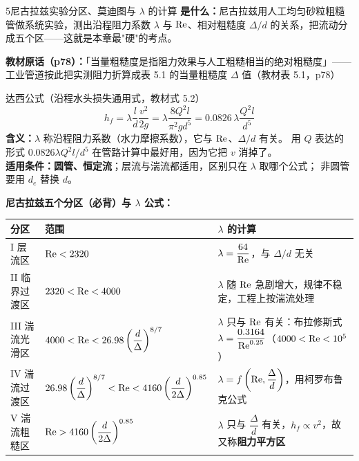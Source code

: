 \begin{kaodian}{5}{尼古拉兹实验分区、莫迪图与 $\lambda$ 的计算}
\textbf{是什么：}尼古拉兹用人工均匀砂粒粗糙管做系统实验，测出沿程阻力系数 $\lambda$ 与
$\mathrm{Re}$、相对粗糙度 $\Delta/d$ 的关系，把流动分成五个区——这就是本章最"硬"的考点。

\noindent\textbf{教材原话（p78）：}「当量粗糙度是指阻力效果与人工粗糙相当的绝对粗糙度」——
工业管道按此把实测阻力折算成表 5.1 的当量粗糙度 $\Delta$ 值（教材表 5.1，p78）

\begin{gongshi}{达西公式（沿程水头损失通用式，教材式 5.2）}
\[ h_f=\lambda\frac{l}{d}\frac{v^2}{2g}=\lambda\frac{8Q^2l}{\pi^2gd^5}=0.0826\,\lambda\frac{Q^2l}{d^5} \]
\textbf{含义：}$\lambda$ 称沿程阻力系数（水力摩擦系数），它与 $\mathrm{Re}$、$\Delta/d$ 有关。
用 $Q$ 表达的形式 $0.0826\lambda Q^2l/d^5$ 在管路计算中最好用，因为它把 $v$ 消掉了。\\
\textbf{适用条件：}\textbf{圆管、恒定流}；层流与湍流都适用，区别只在 $\lambda$ 取哪个公式；
非圆管要用 $d_e$ 替换 $d$。
\end{gongshi}

\textbf{尼古拉兹五个分区（必背）与 $\lambda$ 公式：}
\begin{center}
\begin{tabularx}{\textwidth}{@{}lXX@{}}
\toprule
分区 & 范围 & $\lambda$ 的计算 \\
\midrule
I 层流区 & $\mathrm{Re}<2320$ & $\lambda=\dfrac{64}{\mathrm{Re}}$，与 $\Delta/d$ 无关 \\
II 临界过渡区 & $2320<\mathrm{Re}<4000$ & $\lambda$ 随 $\mathrm{Re}$ 急剧增大，规律不稳定，工程上按湍流处理 \\
III 湍流光滑区 & $4000<\mathrm{Re}<26.98\left(\dfrac{d}{\Delta}\right)^{8/7}$ & $\lambda$ 只与 $\mathrm{Re}$ 有关：布拉修斯式 $\lambda=\dfrac{0.3164}{\mathrm{Re}^{0.25}}$（$4000<\mathrm{Re}<10^5$） \\
IV 湍流过渡区 & $26.98\left(\dfrac{d}{\Delta}\right)^{8/7}<\mathrm{Re}<4160\left(\dfrac{d}{2\Delta}\right)^{0.85}$ & $\lambda=f\left(\mathrm{Re},\dfrac{\Delta}{d}\right)$，用柯罗布鲁克公式 \\
V 湍流粗糙区 & $\mathrm{Re}>4160\left(\dfrac{d}{2\Delta}\right)^{0.85}$ & $\lambda$ 只与 $\dfrac{\Delta}{d}$ 有关，$h_f\propto v^2$，故又称\textbf{阻力平方区} \\
\bottomrule
\end{tabularx}
\end{center}


\end{kaodian}
